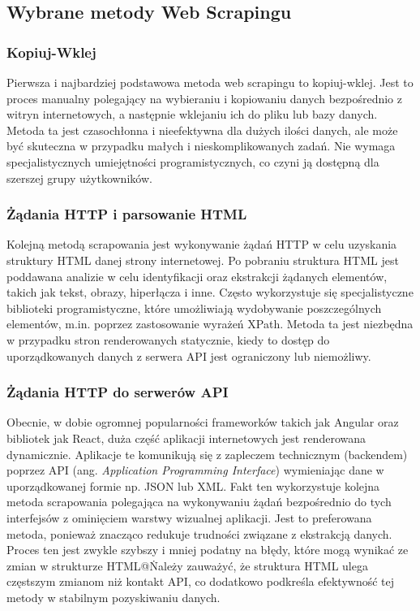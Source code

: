 \subsection{Wybrane metody Web Scrapingu}\label{subsec:web-scraping-methods}

\subsubsection{Kopiuj-Wklej}

Pierwsza i najbardziej podstawowa metoda web scrapingu to kopiuj-wklej.
Jest to proces manualny polegający na wybieraniu i kopiowaniu danych bezpośrednio z witryn internetowych, a następnie wklejaniu ich do pliku lub bazy danych.
Metoda ta jest czasochłonna i nieefektywna dla dużych ilości danych, ale może być skuteczna w przypadku małych i nieskomplikowanych zadań\cite{state-of-art}.
Nie wymaga specjalistycznych umiejętności programistycznych, co czyni ją dostępną dla szerszej grupy użytkowników.

\subsubsection{Żądania HTTP i parsowanie HTML}

Kolejną metodą scrapowania jest wykonywanie żądań HTTP w celu uzyskania struktury HTML danej strony internetowej.
Po pobraniu struktura HTML jest poddawana analizie w celu identyfikacji oraz ekstrakcji żądanych elementów, takich jak tekst, obrazy, hiperłącza i inne.
Często wykorzystuje się specjalistyczne biblioteki programistyczne, które umożliwiają wydobywanie poszczególnych elementów, m.in. poprzez zastosowanie wyrażeń XPath.
Metoda ta jest niezbędna w przypadku stron renderowanych statycznie, kiedy to dostęp do uporządkowanych danych z serwera API jest ograniczony lub niemożliwy.

\subsubsection{Żądania HTTP do serwerów API}

Obecnie, w dobie ogromnej popularności frameworków takich jak Angular oraz bibliotek jak React, duża część aplikacji internetowych jest renderowana dynamicznie.
Aplikacje te komunikują się z zapleczem technicznym (backendem) poprzez API (ang. \emph{Application Programming Interface}) wymieniając dane w uporządkowanej formie np. JSON lub XML.
Fakt ten wykorzystuje kolejna metoda scrapowania polegająca na wykonywaniu żądań bezpośrednio do tych interfejsów z ominięciem warstwy wizualnej aplikacji.
Jest to preferowana metoda, ponieważ znacząco redukuje trudności związane z ekstrakcją danych.
Proces ten jest zwykle szybszy i mniej podatny na błędy, które mogą wynikać ze zmian w strukturze HTML@\.
Należy zauważyć, że struktura HTML ulega częstszym zmianom niż kontakt API, co dodatkowo podkreśla efektywność tej metody w stabilnym pozyskiwaniu danych.

